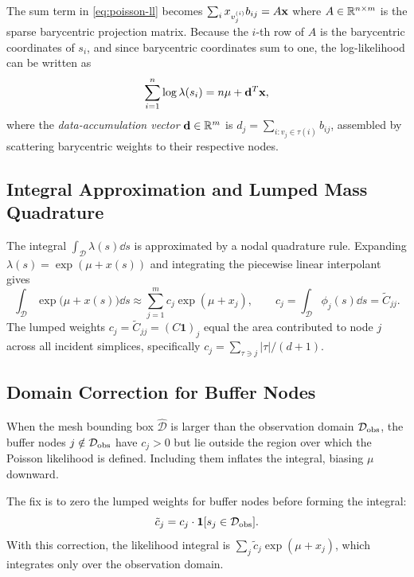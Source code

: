 \documentclass[11pt]{article}
\begin{document}
The sum term in \eqref{eq:poisson-ll} becomes $\sum_i x_{v_j^{(i)}} b_{ij} = A\mathbf{x}$
where $A \in \mathbb{R}^{n \times m}$ is the sparse barycentric projection matrix.
Because the $i$-th row of $A$ is the barycentric coordinates of $s_i$, and
since barycentric coordinates sum to one, the log-likelihood can be written as
\begin{equation}
  \sum_{i=1}^n \log\lambda(s_i) = n\mu + \mathbf{d}^T \mathbf{x},
  \label{eq:data-term}
\end{equation}
where the \emph{data-accumulation vector} $\mathbf{d} \in \mathbb{R}^m$ is
$d_j = \sum_{i : v_j \in \tau(i)} b_{ij}$, assembled by scattering barycentric
weights to their respective nodes.

\subsection{Integral Approximation and Lumped Mass Quadrature}
\label{sec:integral-approx}

The integral $\int_\mathcal{D} \lambda(s) \dd s$ is approximated by a
nodal quadrature rule.  Expanding $\lambda(s) = \exp(\mu + x(s))$ and
integrating the piecewise linear interpolant gives
\begin{equation}
  \int_\mathcal{D} \exp\!\bigl(\mu + x(s)\bigr) \dd s
  \approx \sum_{j=1}^m c_j \exp(\mu + x_j),
  \qquad c_j = \int_\mathcal{D} \phi_j(s) \dd s = \tilde{C}_{jj}.
  \label{eq:integral-approx}
\end{equation}
The lumped weights $c_j = \tilde{C}_{jj} = (C\mathbf{1})_j$ equal the area
contributed to node $j$ across all incident simplices, specifically
$c_j = \sum_{\tau \ni j} |\tau|/(d+1)$.

\subsection{Domain Correction for Buffer Nodes}
\label{sec:obs-bounds}

When the mesh bounding box $\hat{\mathcal{D}}$ is larger than the observation
domain $\mathcal{D}_{\rm obs}$, the buffer nodes $j \notin \mathcal{D}_{\rm obs}$
have $c_j > 0$ but lie outside the region over which the Poisson likelihood is
defined.  Including them inflates the integral, biasing $\mu$ downward.

The fix is to zero the lumped weights for buffer nodes before forming the integral:
\begin{equation}
  \tilde{c}_j = c_j \cdot \mathbf{1}[s_j \in \mathcal{D}_{\rm obs}].
  \label{eq:obs-bounds}
\end{equation}
With this correction, the likelihood integral is $\sum_j \tilde{c}_j \exp(\mu+x_j)$,
which integrates only over the observation domain.
\end{document}
